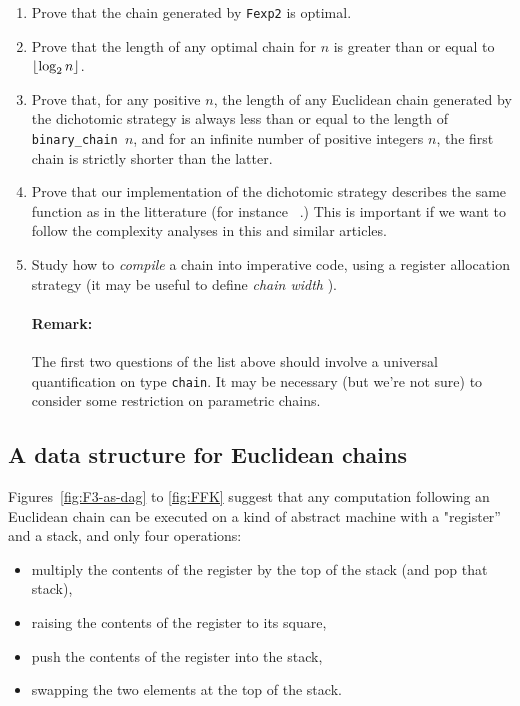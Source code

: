 \begin{project}

\vspace{3pt}

\noindent

\begin{enumerate}
\item  Prove that the chain generated by \texttt{Fexp2} is optimal.
\item Prove that  the length of any optimal chain for $n$ is
greater than or equal to $\lfloor\log_2{n}\rfloor$.
\item Prove that, for any positive $n$, the length of any Euclidean chain generated by the 
  dichotomic strategy  is always less than or equal to
  the length of \texttt{binary\_chain $n$}, and for an infinite number
of positive integers $n$, the first chain  is strictly shorter
than  the latter.
\item Prove that our implementation of the dichotomic strategy describes
 the same function as in the litterature (for instance ~\cite{DBLP:journals/ita/BrlekCHM95}.)
This is important if we want to follow the complexity analyses in this and similar articles.
\item Study how to \emph{compile} a chain into imperative code, using a register allocation strategy (it may be useful  to define \emph{chain width} ).

\paragraph*{Remark:} The first two questions of the list above should involve a 
universal quantification on type
\texttt{chain}. It may be necessary (but we're not sure) to consider  some 
restriction on parametric chains.

\end{enumerate}
\end{project}

\subsection{A data structure for Euclidean chains}


Figures~\vref{fig:F3-as-dag} to \vref{fig:FFK} suggest that any computation following an Euclidean chain can be executed on a kind  of abstract machine with a "register'' and a stack, and only four operations:
\begin{itemize}
\item multiply the contents of the register by the top of the stack (and pop that stack),
\item raising the contents of the register to its square,
\item push the contents of the register into the stack,
\item swapping the two elements at the top of the stack.
\end{itemize}

